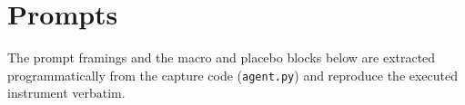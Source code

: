 \documentclass[a4paper,fleqn]{cas-sc}
\begin{document}
\section{Prompts}\label{app:prompts}
The prompt framings and the macro and placebo blocks below are extracted programmatically from the
capture code (\texttt{agent.py}) and reproduce the executed instrument verbatim.





\end{document}
